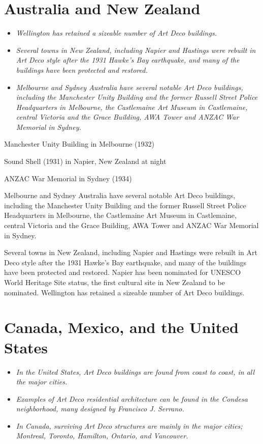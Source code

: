 \section{Australia and New Zealand}\label{australia-and-new-zealand}

\begin{itemize}
\item
  \emph{Wellington has retained a sizeable number of Art Deco
  buildings.}
\item
  \emph{Several towns in New Zealand, including Napier and Hastings were
  rebuilt in Art Deco style after the 1931 Hawke's Bay earthquake, and
  many of the buildings have been protected and restored.}
\item
  \emph{Melbourne and Sydney Australia have several notable Art Deco
  buildings, including the Manchester Unity Building and the former
  Russell Street Police Headquarters in Melbourne, the Castlemaine Art
  Museum in Castlemaine, central Victoria and the Grace Building, AWA
  Tower and ANZAC War Memorial in Sydney.}
\end{itemize}

Manchester Unity Building in Melbourne (1932)

Sound Shell (1931) in Napier, New Zealand at night

ANZAC War Memorial in Sydney (1934)

Melbourne and Sydney Australia have several notable Art Deco buildings,
including the Manchester Unity Building and the former Russell Street
Police Headquarters in Melbourne, the Castlemaine Art Museum in
Castlemaine, central Victoria and the Grace Building, AWA Tower and
ANZAC War Memorial in Sydney.

Several towns in New Zealand, including Napier and Hastings were rebuilt
in Art Deco style after the 1931 Hawke's Bay earthquake, and many of the
buildings have been protected and restored. Napier has been nominated
for UNESCO World Heritage Site status, the first cultural site in New
Zealand to be nominated. Wellington has retained a sizeable number of
Art Deco buildings.

\section{Canada, Mexico, and the United
States}\label{canada-mexico-and-the-united-states}

\begin{itemize}
\item
  \emph{In the United States, Art Deco buildings are found from coast to
  coast, in all the major cities.}
\item
  \emph{Examples of Art Deco residential architecture can be found in
  the Condesa neighborhood, many designed by Francisco J. Serrano.}
\item
  \emph{In Canada, surviving Art Deco structures are mainly in the major
  cities; Montreal, Toronto, Hamilton, Ontario, and Vancouver.}
\end{itemize}

